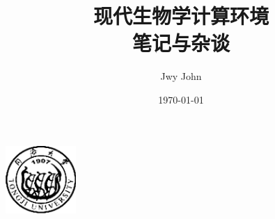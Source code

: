 \documentclass[cn,black,14pt,device=normal]{elegantnote}
\title{现代生物学计算环境\\笔记与杂谈}
\author{Jwy John}
\institute{School of Life Science, Tongji University}
\date{\today}
\begin{document}
\maketitle

\centerline{
  \includegraphics[width=0.2\textwidth]{images/logo-tongji.png}
}

\newpage














%
\end{document}
